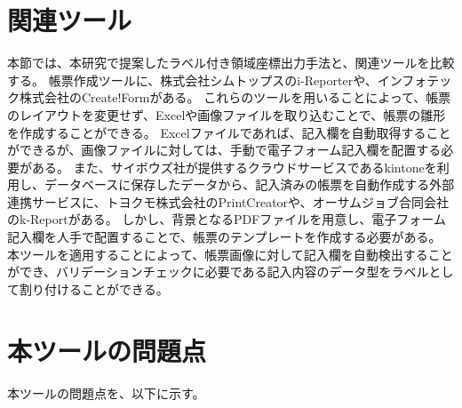 




\section{関連ツール}\label{sec:relation_tools}
本節では、本研究で提案したラベル付き領域座標出力手法と、関連ツールを比較する。
帳票作成ツールに、株式会社シムトップスのi-Reporter\cite{i-Reporter}や、インフォテック株式会社のCreate!Form\cite{Create!Form}がある。
これらのツールを用いることによって、帳票のレイアウトを変更せず、Excelや画像ファイルを取り込むことで、帳票の雛形を作成することができる。
Excelファイルであれば、記入欄を自動取得することができるが、画像ファイルに対しては、手動で電子フォーム記入欄を配置する必要がある。
また、サイボウズ社が提供するクラウドサービスであるkintone\cite{kintone}を利用し、データベースに保存したデータから、記入済みの帳票を自動作成する外部連携サービスに、トヨクモ株式会社のPrintCreator\cite{PrintCreator}や、オーサムジョブ合同会社のk-Report\cite{k-Report}がある。
しかし、背景となるPDFファイルを用意し、電子フォーム記入欄を人手で配置することで、帳票のテンプレートを作成する必要がある。
本ツールを適用することによって、帳票画像に対して記入欄を自動検出することができ、バリデーションチェックに必要である記入内容のデータ型をラベルとして割り付けることができる。

\section{本ツールの問題点}\label{sec:problems}
本ツールの問題点を、以下に示す。

